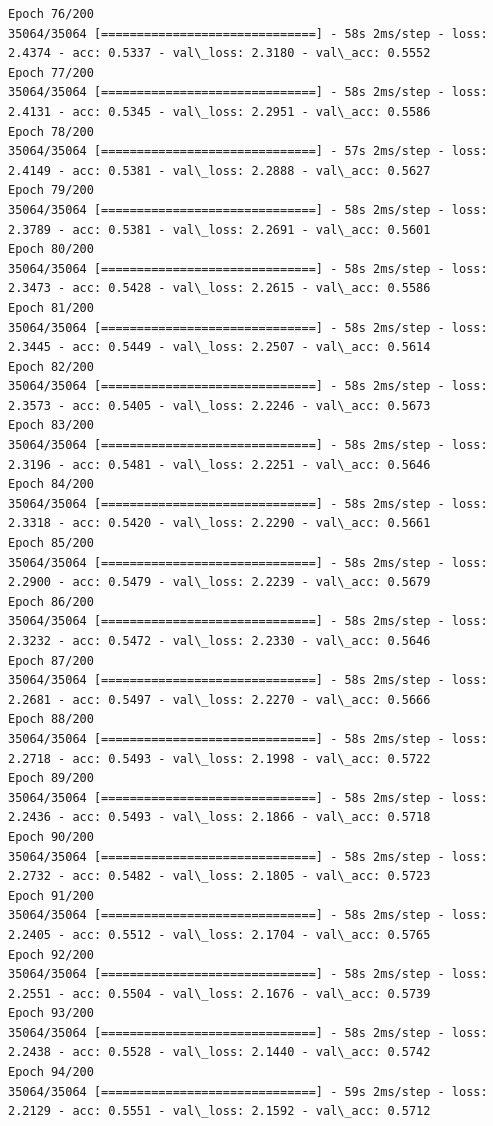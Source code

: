 \documentclass[11pt]{article}
\begin{document}
\begin{Verbatim}[commandchars=\\\{\}]
Epoch 76/200
35064/35064 [==============================] - 58s 2ms/step - loss: 2.4374 - acc: 0.5337 - val\_loss: 2.3180 - val\_acc: 0.5552
Epoch 77/200
35064/35064 [==============================] - 58s 2ms/step - loss: 2.4131 - acc: 0.5345 - val\_loss: 2.2951 - val\_acc: 0.5586
Epoch 78/200
35064/35064 [==============================] - 57s 2ms/step - loss: 2.4149 - acc: 0.5381 - val\_loss: 2.2888 - val\_acc: 0.5627
Epoch 79/200
35064/35064 [==============================] - 58s 2ms/step - loss: 2.3789 - acc: 0.5381 - val\_loss: 2.2691 - val\_acc: 0.5601
Epoch 80/200
35064/35064 [==============================] - 58s 2ms/step - loss: 2.3473 - acc: 0.5428 - val\_loss: 2.2615 - val\_acc: 0.5586
Epoch 81/200
35064/35064 [==============================] - 58s 2ms/step - loss: 2.3445 - acc: 0.5449 - val\_loss: 2.2507 - val\_acc: 0.5614
Epoch 82/200
35064/35064 [==============================] - 58s 2ms/step - loss: 2.3573 - acc: 0.5405 - val\_loss: 2.2246 - val\_acc: 0.5673
Epoch 83/200
35064/35064 [==============================] - 58s 2ms/step - loss: 2.3196 - acc: 0.5481 - val\_loss: 2.2251 - val\_acc: 0.5646
Epoch 84/200
35064/35064 [==============================] - 58s 2ms/step - loss: 2.3318 - acc: 0.5420 - val\_loss: 2.2290 - val\_acc: 0.5661
Epoch 85/200
35064/35064 [==============================] - 58s 2ms/step - loss: 2.2900 - acc: 0.5479 - val\_loss: 2.2239 - val\_acc: 0.5679
Epoch 86/200
35064/35064 [==============================] - 58s 2ms/step - loss: 2.3232 - acc: 0.5472 - val\_loss: 2.2330 - val\_acc: 0.5646
Epoch 87/200
35064/35064 [==============================] - 58s 2ms/step - loss: 2.2681 - acc: 0.5497 - val\_loss: 2.2270 - val\_acc: 0.5666
Epoch 88/200
35064/35064 [==============================] - 58s 2ms/step - loss: 2.2718 - acc: 0.5493 - val\_loss: 2.1998 - val\_acc: 0.5722
Epoch 89/200
35064/35064 [==============================] - 58s 2ms/step - loss: 2.2436 - acc: 0.5493 - val\_loss: 2.1866 - val\_acc: 0.5718
Epoch 90/200
35064/35064 [==============================] - 58s 2ms/step - loss: 2.2732 - acc: 0.5482 - val\_loss: 2.1805 - val\_acc: 0.5723
Epoch 91/200
35064/35064 [==============================] - 58s 2ms/step - loss: 2.2405 - acc: 0.5512 - val\_loss: 2.1704 - val\_acc: 0.5765
Epoch 92/200
35064/35064 [==============================] - 58s 2ms/step - loss: 2.2551 - acc: 0.5504 - val\_loss: 2.1676 - val\_acc: 0.5739
Epoch 93/200
35064/35064 [==============================] - 58s 2ms/step - loss: 2.2438 - acc: 0.5528 - val\_loss: 2.1440 - val\_acc: 0.5742
Epoch 94/200
35064/35064 [==============================] - 59s 2ms/step - loss: 2.2129 - acc: 0.5551 - val\_loss: 2.1592 - val\_acc: 0.5712

\end{Verbatim}
\end{document}
